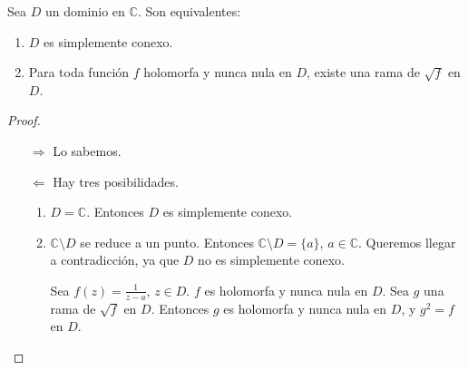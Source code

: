 \begin{theorem}
    Sea $D$ un dominio en $\mathbb{C}$.
    Son equivalentes:
    \begin{enumerate}
        \item $D$ es simplemente conexo.
        \item Para toda función $f$ holomorfa y nunca nula en $D$, existe una rama de $\sqrt{f}$ en $D$.
    \end{enumerate}
\end{theorem}

\begin{proof}
    \hfill
    \begin{itemize}
        \item[$\Rightarrow$] Lo sabemos.
        \item[$\Leftarrow$] Hay tres posibilidades.
            \begin{enumerate}
                \item $D = \mathbb{C}$.
                      Entonces $D$ es simplemente conexo.

                \item $\mathbb{C} \setminus D$ se reduce a un punto.
                      Entonces $\mathbb{C} \setminus D = \{a\}$, $a \in \mathbb{C}$.
                      Queremos llegar a contradicción, ya que $D$ no es simplemente conexo.

                      Sea $f(z) = \frac{1}{z-a}$, $z \in D$.
                      $f$ es holomorfa y nunca nula en $D$.
                      Sea $g$ una rama de $\sqrt{f}$ en $D$.
                      Entonces $g$ es holomorfa y nunca nula en $D$, y $g^2 = f$ en $D$.


\end{enumerate}
\end{itemize}
\end{proof}
